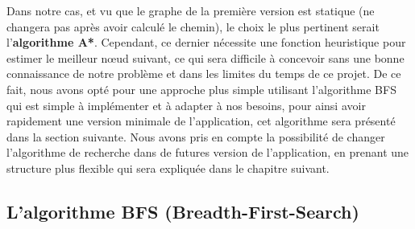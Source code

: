 Dans notre cas, et vu que le graphe de la première version est statique (ne changera pas après avoir calculé le chemin), le choix le plus pertinent serait l'\textbf{algorithme A*}.
Cependant, ce dernier nécessite une fonction heuristique pour estimer le meilleur nœud suivant, ce qui sera difficile à concevoir sans une bonne connaissance de notre problème et dans les limites du temps de ce projet.
De ce fait, nous avons opté pour une approche plus simple utilisant l'algorithme BFS qui est simple à implémenter et à adapter à nos besoins, pour ainsi avoir rapidement une version minimale de l'application, cet algorithme sera présenté dans la section suivante.\newline
Nous avons pris en compte la possibilité de changer l'algorithme de recherche dans de futures version de l'application, en prenant une structure plus flexible qui sera expliquée dans le chapitre suivant.

\subsection{L'algorithme BFS (Breadth-First-Search)}

